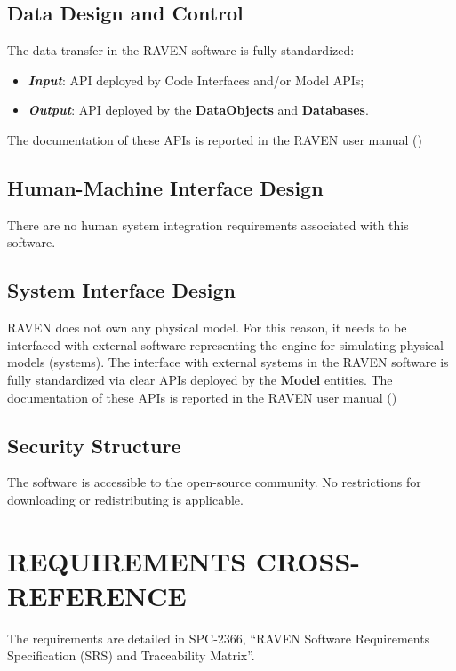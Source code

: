 \subsection{Data Design and Control}
The data transfer in the RAVEN software is fully standardized:
\begin{itemize}
  \item  \textbf{\textit{Input}}: API deployed by Code Interfaces and/or Model APIs;
  \item \textbf{\textit{Output}}: API deployed by the \textbf{DataObjects}  and \textbf{Databases}.
\end{itemize}
The documentation of these APIs is reported in the RAVEN user manual (\cite{RAVENuserManual})

\subsection{Human-Machine Interface Design} 
 There are no human system integration requirements associated with this software.
 \subsection{System Interface Design} 
RAVEN does not own any physical model. For this reason, it needs to be interfaced with external
software representing the engine for simulating physical models (systems). 
The interface with external systems in the RAVEN software is fully standardized via clear APIs deployed by
 the \textbf{Model}  entities.
The documentation of these APIs is reported in the RAVEN user manual (\cite{RAVENuserManual})

 \subsection{Security Structure} 
The software is accessible to the open-source community. No restrictions for downloading or redistributing is applicable.

 \section{REQUIREMENTS CROSS-REFERENCE} 
The requirements are detailed in SPC-2366, ``RAVEN Software Requirements Specification (SRS) and Traceability Matrix''.